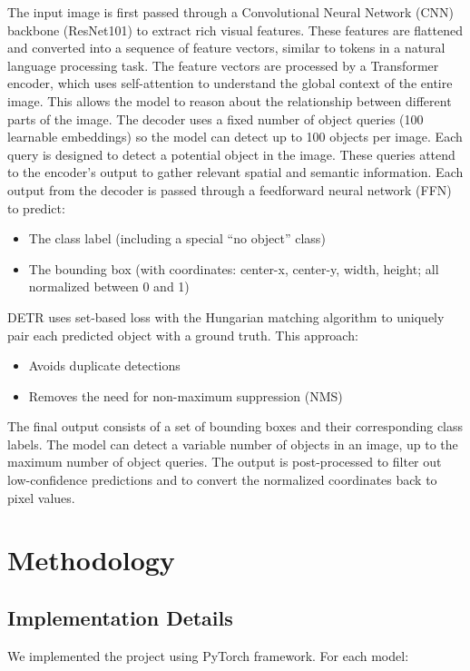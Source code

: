 \documentclass[12pt,a4paper]{article}
\begin{document}
The input image is first passed through a Convolutional Neural Network (CNN) backbone (ResNet101) to extract rich visual features.
These features are flattened and converted into a sequence of feature vectors, similar to tokens in a natural language processing task.
The feature vectors are processed by a Transformer encoder, which uses self-attention to understand the global context of the entire image.
This allows the model to reason about the relationship between different parts of the image.
The decoder uses a fixed number of object queries (100 learnable embeddings) so the model can detect up to 100 objects per image.
Each query is designed to detect a potential object in the image.
These queries attend to the encoder’s output to gather relevant spatial and semantic information.
Each output from the decoder is passed through a feedforward neural network (FFN) to predict:
\begin{itemize}
    \item The class label (including a special “no object” class)
    \item The bounding box (with coordinates: center-x, center-y, width, height; all normalized between 0 and 1)
\end{itemize}
DETR uses set-based loss with the Hungarian matching algorithm to uniquely pair each predicted object with a ground truth.
This approach:
\begin{itemize}
    \item Avoids duplicate detections
    \item Removes the need for non-maximum suppression (NMS)
\end{itemize}
The final output consists of a set of bounding boxes and their corresponding class labels.
The model can detect a variable number of objects in an image, up to the maximum number of object queries.
The output is post-processed to filter out low-confidence predictions and to convert the normalized coordinates back to pixel values.



\section{Methodology}
\subsection{Implementation Details}
We implemented the project using PyTorch framework. For each model:
\end{document}

